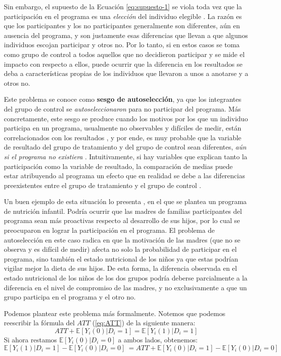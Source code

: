 \documentclass[../../main.tex]{subfiles}
\begin{document}
Sin embargo, el supuesto de la Ecuación \ref{eq:supuesto-1} se viola toda vez que la participación en el programa es una \textit{elección} del individuo elegible \cite{bernal}. La razón es que los participantes y los no participantes generalmente son diferentes, aún en ausencia del programa, y son justamente esas diferencias que llevan a que algunos individuos escojan participar y otros no. Por lo tanto, si en estos casos se toma como grupo de control a todos aquellos que no decidieron participar y se mide el impacto con respecto a ellos, puede ocurrir que la diferencia en los resultados se deba a características propias de los individuos que llevaron a unos a anotarse y a otros no.

Este problema se conoce como \textbf{sesgo de autoselección}, ya que los integrantes del grupo de control se \textit{autoseleccionaron} para no participar del programa. Más concretamente, este sesgo se produce cuando los motivos por los que un individuo participa en un programa, usualmente no observables y difíciles de medir, están correlacionados con los resultados \cite{gertler-2016}, y por ende, es muy probable que la variable de resultado del grupo de tratamiento y del grupo de control sean diferentes, \textit{aún si el programa no existiera} \cite{bernal}. Intuitivamente, si hay variables que explican tanto la participación como la variable de resultado, la comparación de medias puede estar atribuyendo al programa un efecto que en realidad se debe a las diferencias preexistentes entre el grupo de tratamiento y el grupo de control \cite{bernal}.

Un buen ejemplo de esta situación lo presenta \cite{bernal}, en el que se plantea un programa de nutrición infantil. Podría ocurrir que las madres de familias participantes del programa sean más proactivas respecto al desarrollo de sus hijos, por lo cual se preocuparon en lograr la participación en el programa. El problema de autoselección en este caso radica en que la motivación de las madres (que no se observa y es difícil de medir) afecta no solo la probabilidad de participar en el programa, sino también el estado nutricional de los niños ya que estas podrían vigilar mejor la dieta de sus hijos. De esta forma, la diferencia observada en el estado nutricional de los niños de los dos grupos podría deberse parcialmente a la diferencia en el nivel de compromiso de las madres, y no exclusivamente a que un grupo participa en el programa y el otro no.

Podemos plantear este problema más formalmente. Notemos que podemos reescribir la fórmula del \(ATT\) (\ref{eq:ATT}) de la siguiente manera:
\begin{equation}
    ATT + \mathbb{E} \left[Y_i(0)|D_i=1\right] = \mathbb{E} \left[Y_i(1)|D_i=1\right] 
    \label{eq:ATT2}
\end{equation}
Si ahora restamos \(\mathbb{E} \left[Y_i(0)|D_i=0\right]\) a ambos lados, obtenemos:
\begin{equation}
    \mathbb{E} \left[Y_i(1)|D_i=1\right] - \mathbb{E} \left[Y_i(0)|D_i=0\right]\ = ATT + \mathbb{E} \left[Y_i(0)|D_i=1\right] - \mathbb{E} \left[Y_i(0)|D_i=0\right]\
    \label{eq:ATT3}
\end{equation}
\end{document}
